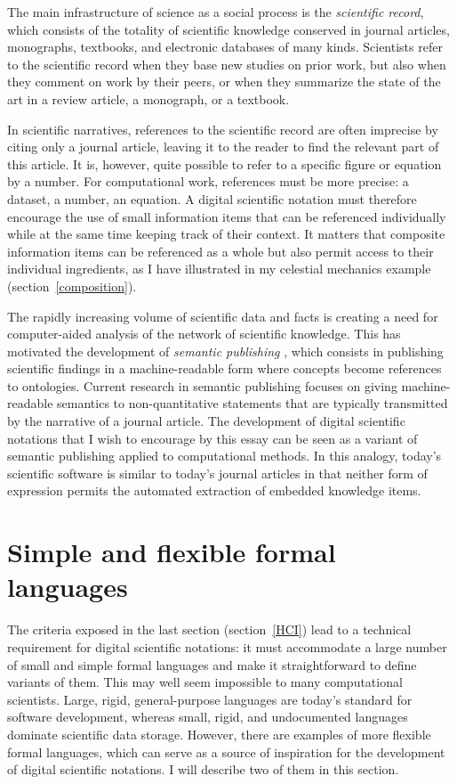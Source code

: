The main infrastructure of science as a social process is the \textit{scientific record}, which consists of the totality of scientific knowledge conserved in journal articles, monographs, textbooks, and electronic databases of many kinds. Scientists refer to the scientific record when they base new studies on prior work, but also when they comment on work by their peers, or when they summarize the state of the art in a review article, a monograph, or a textbook.

In scientific narratives, references to the scientific record are often imprecise by citing only a journal article, leaving it to the reader to find the relevant part of this article. It is, however, quite possible to refer to a specific figure or equation by a number. For computational work, references must be more precise: a dataset, a number, an equation. A digital scientific notation must therefore encourage the use of small information items that can be referenced individually while at the same time keeping track of their context. It matters that composite information items can be referenced as a whole but also permit access to their individual ingredients, as I have illustrated in my celestial mechanics example (section~\ref{composition}).

The rapidly increasing volume of scientific data and facts is creating a need for computer-aided analysis of the network of scientific knowledge. This has motivated the development of \textit{semantic publishing} \cite{shotton_semantic_2009}, which consists in publishing scientific findings in a machine-readable form where concepts become references to ontologies. Current research in semantic publishing focuses on giving machine-readable semantics to non-quantitative statements that are typically transmitted by the narrative of a journal article. The development of digital scientific notations that I wish to encourage by this essay can be seen as a variant of semantic publishing applied to computational methods. In this analogy, today's scientific software is similar to today's journal articles in that neither form of expression permits the automated extraction of embedded knowledge items.

\section{Simple and flexible formal languages}
\label{simple-and-flexible}

The criteria exposed in the last section (section~\ref{HCI}) lead to a technical requirement for digital scientific notations: it must accommodate a large number of small and simple formal languages and make it straightforward to define variants of them. This may well seem impossible to many computational scientists. Large, rigid, general-purpose languages are today's standard for software development, whereas small, rigid, and undocumented languages dominate scientific data storage. However, there are examples of more flexible formal languages, which can serve as a source of inspiration for the development of digital scientific notations. I will describe two of them in this section.

